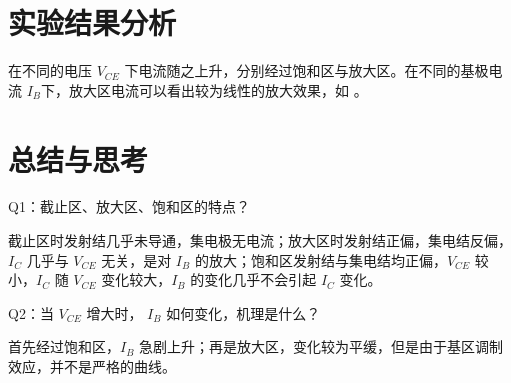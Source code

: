 \documentclass[lang=cn,11pt,a4paper,cite=authoryear]{elegantpaper}
\begin{document}

\section{实验结果分析}

在不同的电压 \(V_{CE}\) 下电流随之上升，分别经过饱和区与放大区。在不同的基极电流 \(I_B\)下，放大区电流可以看出较为线性的放大效果，如 。


\section{总结与思考}

Q1：截止区、放大区、饱和区的特点？

截止区时发射结几乎未导通，集电极无电流；放大区时发射结正偏，集电结反偏，\(I_C\) 几乎与 \(V_{CE}\) 无关，是对 \(I_B\) 的放大；饱和区发射结与集电结均正偏，\(V_{CE}\) 较小，\(I_C\) 随 \(V_{CE}\) 变化较大，\(I_B\) 的变化几乎不会引起 \(I_{C}\) 变化。

Q2：当 \(V_{CE}\) 增大时， \(I_B\) 如何变化，机理是什么？

首先经过饱和区，\(I_B\) 急剧上升；再是放大区，变化较为平缓，但是由于基区调制效应，并不是严格的曲线。


\end{document}
